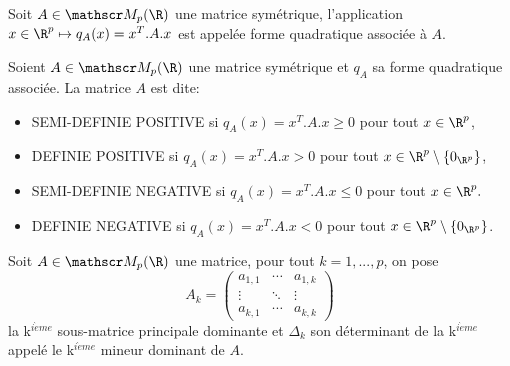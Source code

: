 \documentclass[class=report,crop=false]{standalone}
\begin{document}
\begin{definition}
\textcolor[rgb]{0.98,0.00,0.00}{ 
  Soit
 $A \in \mat_p(\R)$ une matrice symétrique, l'application
 $x \in \R^p \mapsto q_A(x)=x^T.A.x$ est appelée forme quadratique
 associée à $A$. }
\end{definition}

\begin{definition}
\textcolor[rgb]{0.98,0.00,0.00}{
  Soient
 $A \in \mat_p(\R)$ une matrice symétrique et $q_A$ sa forme quadratique  associée. La matrice $A$ est dite:
 \begin{itemize}
  \item  SEMI-DEFINIE POSITIVE si $q_A(x)=x^T.A.x \geq 0$ pour tout $x\in \R^p$,
 \item DEFINIE POSITIVE si $q_A(x)=x^T.A.x > 0$ pour tout $x\in \R^p\setminus\{0_{\R^p}\}$,
 \item  SEMI-DEFINIE NEGATIVE si $q_A(x)=x^T.A.x \leq 0$ pour tout $x\in \R^p.$
 \item DEFINIE NEGATIVE si $q_A(x)=x^T.A.x < 0$ pour tout $x\in \R^p\setminus\{0_{\R^p}\}$.
 \end{itemize}}
 \end{definition}


\begin{definition}
\textcolor[rgb]{0.98,0.00,0.00}{ 
  Soit
 $A \in \mat_p(\R)$ une matrice, pour tout $k=1,...,p$, on pose
   \begin{equation*}
  A_k=\left(\begin{matrix}
a_{1,1} & \cdots & a_{1,k} \\ 
\vdots & \ddots & \vdots \\ 
a_{k,1} & \cdots & a_{k,k}
\end{matrix} \right)
  \end{equation*}
  la k$^{i\grave{e}me}$ sous-matrice principale dominante et $\Delta_k$ son  déterminant de la k$^{i\grave{e}me}$  appelé le k$^{i\grave{e}me}$ mineur dominant de $A$.}
 \end{definition}


%
\end{document}
